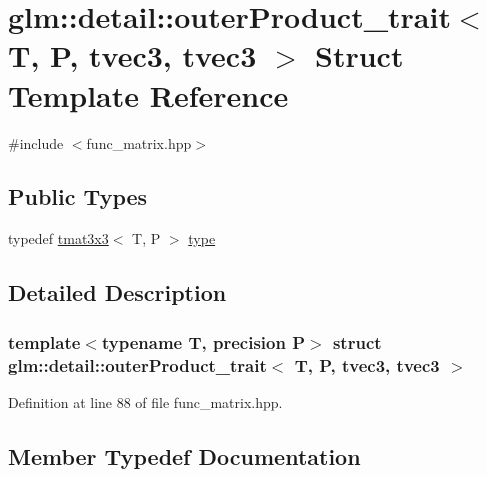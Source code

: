 \hypertarget{structglm_1_1detail_1_1outer_product__trait_3_01_t_00_01_p_00_01tvec3_00_01tvec3_01_4}{}\section{glm\+:\+:detail\+:\+:outer\+Product\+\_\+trait$<$ T, P, tvec3, tvec3 $>$ Struct Template Reference}
\label{structglm_1_1detail_1_1outer_product__trait_3_01_t_00_01_p_00_01tvec3_00_01tvec3_01_4}


{\ttfamily \#include $<$func\+\_\+matrix.\+hpp$>$}

\subsection*{Public Types}
\begin{DoxyCompactItemize}
\item 
typedef \hyperlink{structglm_1_1detail_1_1tmat3x3}{tmat3x3}$<$ T, P $>$ \hyperlink{structglm_1_1detail_1_1outer_product__trait_3_01_t_00_01_p_00_01tvec3_00_01tvec3_01_4_ac6a4ba81935840a9b4e4603f0bc0e222}{type}
\end{DoxyCompactItemize}


\subsection{Detailed Description}
\subsubsection*{template$<$typename T, precision P$>$\newline
struct glm\+::detail\+::outer\+Product\+\_\+trait$<$ T, P, tvec3, tvec3 $>$}



Definition at line 88 of file func\+\_\+matrix.\+hpp.



\subsection{Member Typedef Documentation}
\mbox{\label{structglm_1_1detail_1_1outer_product__trait_3_01_t_00_01_p_00_01tvec3_00_01tvec3_01_4_ac6a4ba81935840a9b4e4603f0bc0e222}} 
